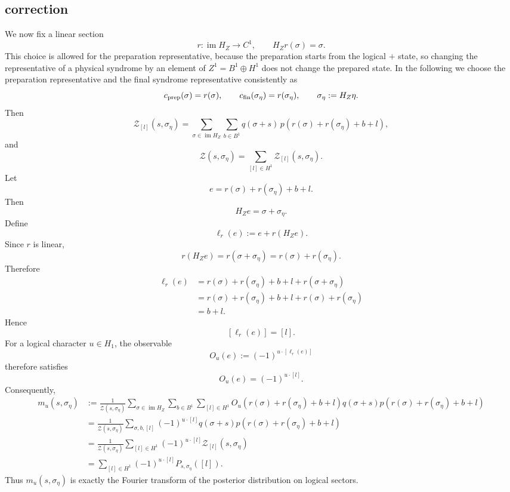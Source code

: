 \documentclass[twoside,english,aps,showpacs,pra,superscriptaddress]{revtex4-2}
\begin{document}
\subsection{correction}
We now fix a linear section
\[
    r:\operatorname{im}H_Z\to C^1,
    \qquad
    H_Zr(\sigma)=\sigma .
\]
This choice is allowed for the preparation representative, because the
preparation starts from the logical \(+\) state, so changing the representative
of a physical syndrome by an element of \(Z^1=B^1\oplus H^1\) does not change
the prepared state. In the following we choose the preparation representative
and the final syndrome representative consistently as
\[
    c_{\rm prep}(\sigma)=r(\sigma),
    \qquad
    c_{\rm fin}(\sigma_\eta)=r(\sigma_\eta),
    \qquad
    \sigma_\eta:=H_Z\eta .
\]
Then
\[
    \mathcal Z_{[l]}(s,\sigma_\eta)
    =
    \sum_{\sigma\in\operatorname{im}H_Z}
    \sum_{b\in B^1}
    q(\sigma+s)\,
    p\!\left(r(\sigma)+r(\sigma_\eta)+b+l\right),
\]
and
\[
    \mathcal Z(s,\sigma_\eta)
    =
    \sum_{[l]\in H^1}\mathcal Z_{[l]}(s,\sigma_\eta).
\]
Let
\[
    e=r(\sigma)+r(\sigma_\eta)+b+l .
\]
Then
\[
    H_Ze=\sigma+\sigma_\eta .
\]
Define
\[
    \ell_r(e):=e+r(H_Ze).
\]
Since \(r\) is linear,
\[
    r(H_Ze)
    =
    r(\sigma+\sigma_\eta)
    =
    r(\sigma)+r(\sigma_\eta).
\]
Therefore
\[
\begin{aligned}
    \ell_r(e)
    &=
    r(\sigma)+r(\sigma_\eta)+b+l
    +r(\sigma+\sigma_\eta)  \\
    &=
    r(\sigma)+r(\sigma_\eta)+b+l
    +r(\sigma)+r(\sigma_\eta)  \\
    &=
    b+l .
\end{aligned}
\]
Hence
\[
    [\ell_r(e)]=[l].
\]
For a logical character \(u\in H_1\), the observable
\[
    O_u(e):=(-1)^{u\cdot[\ell_r(e)]}
\]
therefore satisfies
\[
    O_u(e)=(-1)^{u\cdot[l]}.
\]
Consequently,
\[
\begin{aligned}
    m_u(s,\sigma_\eta)
    &:=
    \frac{1}{\mathcal Z(s,\sigma_\eta)}
    \sum_{\sigma\in\operatorname{im}H_Z}
    \sum_{b\in B^1}
    \sum_{[l]\in H^1}
    O_u\!\left(r(\sigma)+r(\sigma_\eta)+b+l\right)
    q(\sigma+s)
    p\!\left(r(\sigma)+r(\sigma_\eta)+b+l\right)
    \\
    &=
    \frac{1}{\mathcal Z(s,\sigma_\eta)}
    \sum_{\sigma,b,[l]}
    (-1)^{u\cdot[l]}
    q(\sigma+s)
    p\!\left(r(\sigma)+r(\sigma_\eta)+b+l\right)
    \\
    &=
    \frac{1}{\mathcal Z(s,\sigma_\eta)}
    \sum_{[l]\in H^1}
    (-1)^{u\cdot[l]}
    \mathcal Z_{[l]}(s,\sigma_\eta)
    \\
    &=
    \sum_{[l]\in H^1}
    (-1)^{u\cdot[l]}
    P_{s,\sigma_\eta}([l]).
\end{aligned}
\]
Thus \(m_u(s,\sigma_\eta)\) is exactly the Fourier transform of the posterior
distribution on logical sectors.
\end{document}
